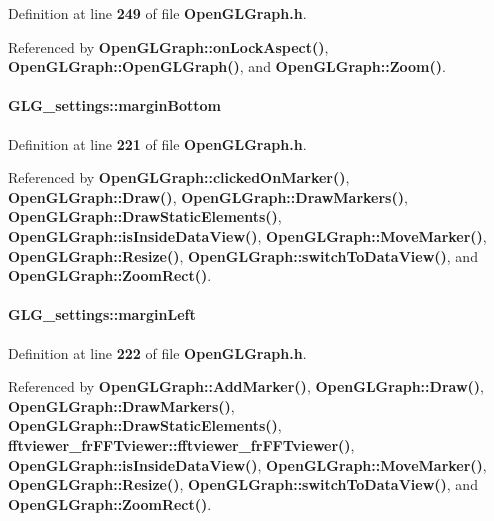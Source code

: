Definition at line {\bf 249} of file {\bf Open\+G\+L\+Graph.\+h}.



Referenced by {\bf Open\+G\+L\+Graph\+::on\+Lock\+Aspect()}, {\bf Open\+G\+L\+Graph\+::\+Open\+G\+L\+Graph()}, and {\bf Open\+G\+L\+Graph\+::\+Zoom()}.

\paragraph[{margin\+Bottom}]{ G\+L\+G\+\_\+settings\+::margin\+Bottom}\label{structGLG__settings_affcf6d17cc1e470e10caa3eb8dead3ea}


Definition at line {\bf 221} of file {\bf Open\+G\+L\+Graph.\+h}.



Referenced by {\bf Open\+G\+L\+Graph\+::clicked\+On\+Marker()}, {\bf Open\+G\+L\+Graph\+::\+Draw()}, {\bf Open\+G\+L\+Graph\+::\+Draw\+Markers()}, {\bf Open\+G\+L\+Graph\+::\+Draw\+Static\+Elements()}, {\bf Open\+G\+L\+Graph\+::is\+Inside\+Data\+View()}, {\bf Open\+G\+L\+Graph\+::\+Move\+Marker()}, {\bf Open\+G\+L\+Graph\+::\+Resize()}, {\bf Open\+G\+L\+Graph\+::switch\+To\+Data\+View()}, and {\bf Open\+G\+L\+Graph\+::\+Zoom\+Rect()}.

\paragraph[{margin\+Left}]{ G\+L\+G\+\_\+settings\+::margin\+Left}\label{structGLG__settings_a30d273182ed7488632824be2618691ca}


Definition at line {\bf 222} of file {\bf Open\+G\+L\+Graph.\+h}.



Referenced by {\bf Open\+G\+L\+Graph\+::\+Add\+Marker()}, {\bf Open\+G\+L\+Graph\+::\+Draw()}, {\bf Open\+G\+L\+Graph\+::\+Draw\+Markers()}, {\bf Open\+G\+L\+Graph\+::\+Draw\+Static\+Elements()}, {\bf fftviewer\+\_\+fr\+F\+F\+Tviewer\+::fftviewer\+\_\+fr\+F\+F\+Tviewer()}, {\bf Open\+G\+L\+Graph\+::is\+Inside\+Data\+View()}, {\bf Open\+G\+L\+Graph\+::\+Move\+Marker()}, {\bf Open\+G\+L\+Graph\+::\+Resize()}, {\bf Open\+G\+L\+Graph\+::switch\+To\+Data\+View()}, and {\bf Open\+G\+L\+Graph\+::\+Zoom\+Rect()}.


